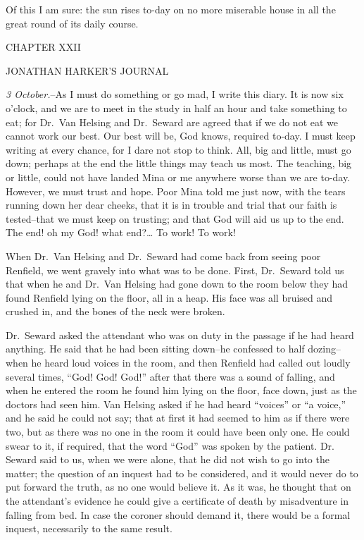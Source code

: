 \documentclass[12pt,openright]{book}
\begin{document}
Of this I am sure: the sun rises to-day on no more miserable house in all the great round of its daily course.

CHAPTER XXII

JONATHAN HARKER’S JOURNAL

\textit{3 October.}–As I must do something or go mad, I write this diary. It is now six o’clock, and we are to meet in the study in half an hour and take something to eat; for Dr. Van Helsing and Dr. Seward are agreed that if we do not eat we cannot work our best. Our best will be, God knows, required to-day. I must keep writing at every chance, for I dare not stop to think. All, big and little, must go down; perhaps at the end the little things may teach us most. The teaching, big or little, could not have landed Mina or me anywhere worse than we are to-day. However, we must trust and hope. Poor Mina told me just now, with the tears running down her dear cheeks, that it is in trouble and trial that our faith is tested–that we must keep on trusting; and that God will aid us up to the end. The end! oh my God! what end?… To work! To work!

When Dr. Van Helsing and Dr. Seward had come back from seeing poor Renfield, we went gravely into what was to be done. First, Dr. Seward told us that when he and Dr. Van Helsing had gone down to the room below they had found Renfield lying on the floor, all in a heap. His face was all bruised and crushed in, and the bones of the neck were broken.

Dr. Seward asked the attendant who was on duty in the passage if he had heard anything. He said that he had been sitting down–he confessed to half dozing–when he heard loud voices in the room, and then Renfield had called out loudly several times, “God! God! God!” after that there was a sound of falling, and when he entered the room he found him lying on the floor, face down, just as the doctors had seen him. Van Helsing asked if he had heard “voices” or “a voice,” and he said he could not say; that at first it had seemed to him as if there were two, but as there was no one in the room it could have been only one. He could swear to it, if required, that the word “God” was spoken by the patient. Dr. Seward said to us, when we were alone, that he did not wish to go into the matter; the question of an inquest had to be considered, and it would never do to put forward the truth, as no one would believe it. As it was, he thought that on the attendant’s evidence he could give a certificate of death by misadventure in falling from bed. In case the coroner should demand it, there would be a formal inquest, necessarily to the same result.
\end{document}
